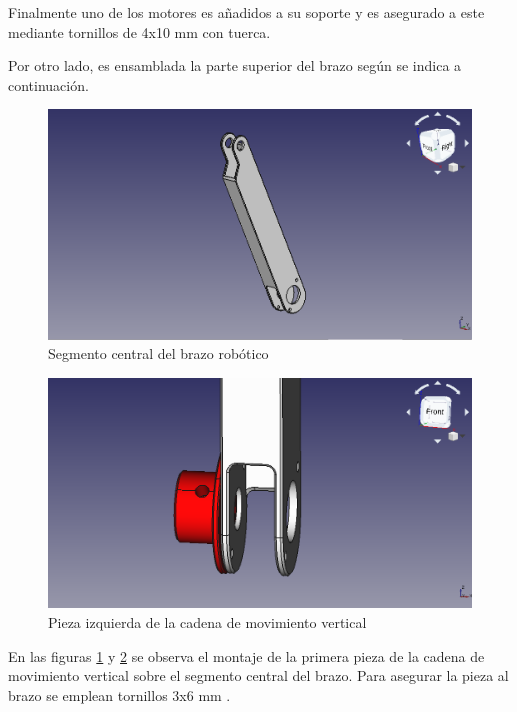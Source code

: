 Finalmente uno de los motores es añadidos a su soporte y es asegurado a este mediante tornillos de 4x10 mm con tuerca.

Por otro lado, es ensamblada la parte superior del brazo según se indica a continuación.

\begin{figure}[H]
    \centering 
    \includegraphics[width=1\linewidth]{pictures/SegmentoCentralBrazo.png}
    \caption{Segmento central del brazo robótico}
    \label{fig:segmento_central_brazo}
\end{figure}

\begin{figure}[H]
    \centering 
    \includegraphics[width=1\linewidth]{pictures/SoporteMotorIzquierdo.png}
    \caption{Pieza izquierda de la cadena de movimiento vertical}
    \label{fig:pieza_izquierda_brazo}
\end{figure}

En las figuras \ref{fig:segmento_central_brazo} y \ref{fig:pieza_izquierda_brazo} se observa el montaje de la primera pieza de la cadena de movimiento vertical sobre el segmento central del brazo. Para asegurar la pieza al brazo se emplean tornillos 3x6 mm .

